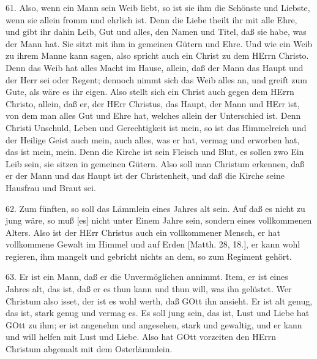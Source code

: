 61. Also, wenn ein Mann sein Weib liebt, so ist sie ihm die Schönste und Liebste, wenn sie allein fromm und ehrlich ist. Denn die Liebe theilt ihr mit alle Ehre, und gibt ihr dahin Leib, Gut und alles, den Namen und Titel, daß sie habe, was der Mann hat. Sie sitzt mit ihm in gemeinen Gütern und Ehre. Und wie ein Weib zu ihrem Manne kann sagen, also spricht auch ein Christ zu dem HErrn Christo. Denn das Weib hat alles Macht im Hause, allein, daß der Mann das Haupt und der Herr sei oder Regent; dennoch nimmt sich das Weib alles an, und
greift zum Gute, als wäre es ihr eigen. Also stellt sich ein Christ auch gegen dem HErrn Christo, allein, daß er, der HErr Christus, das Haupt, der Mann und HErr ist, von dem man alles Gut und Ehre hat, welches allein der Unterschied ist. Denn Christi Unschuld, Leben und Gerechtigkeit ist mein, so ist das Himmelreich und der Heilige Geist auch mein, auch alles, was er hat, vermag und erworben hat, das ist mein, mein. Denn die Kirche ist sein Fleisch und Blut, es sollen zwo Ein Leib sein, sie sitzen in gemeinen Gütern. Also soll man Christum erkennen, daß er der Mann und das Haupt ist der Christenheit, und daß die Kirche seine Hausfrau und Braut sei.

62. Zum fünften, so soll das Lämmlein eines Jahres alt sein. Auf daß es nicht zu jung wäre, so muß [es] nicht unter Einem Jahre sein, sondern eines vollkommenen Alters. Also ist der HErr Christus auch ein vollkommener Mensch, er hat vollkommene Gewalt im Himmel und auf Erden [Matth. 28, 18.], er kann wohl regieren, ihm mangelt und gebricht nichts an dem, so zum Regiment gehört.

63. Er ist ein Mann, daß er die Unvermöglichen annimmt. Item, er ist eines Jahres alt, das ist, daß er es thun kann und thun will, was ihn gelüstet. Wer Christum also isset, der ist es wohl werth, daß GOtt ihn ansieht. Er ist alt genug, das ist, stark genug und vermag es. Es soll jung sein, das ist, Lust und Liebe hat GOtt zu ihm; er ist angenehm und angesehen, stark und gewaltig, und er kann und will helfen mit Lust und Liebe. Also hat GOtt vorzeiten den HErrn Christum abgemalt mit dem Osterlämmlein.

